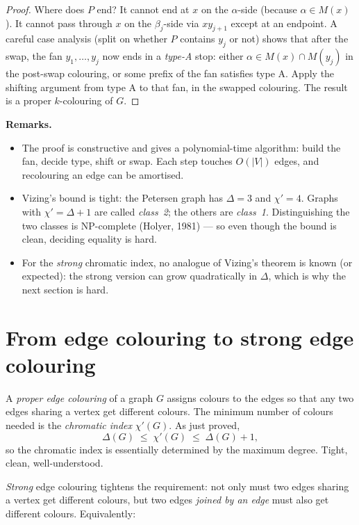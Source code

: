 \documentclass[11pt]{article}
\begin{document}
\begin{proof}
Where does $P$ end? It cannot end at $x$ on the $\alpha$-side
(because $\alpha \in M(x)$). It cannot pass through $x$ on the
$\beta_j$-side via $xy_{j+1}$ except at an endpoint. A careful case
analysis (split on whether $P$ contains $y_j$ or not) shows that
after the swap, the fan $y_1, \dots, y_j$ now ends in a
\emph{type-A} stop: either $\alpha \in M(x) \cap M(y_j)$ in the
post-swap colouring, or some prefix of the fan satisfies type A.
Apply the shifting argument from type A to that fan, in the swapped
colouring. The result is a proper $k$-colouring of $G$.
\end{proof}

\textbf{Remarks.}
\begin{itemize}[leftmargin=*, itemsep=2pt]
  \item The proof is constructive and gives a polynomial-time
        algorithm: build the fan, decide type, shift or swap. Each
        step touches $O(|V|)$ edges, and recolouring an edge can be
        amortised.
  \item Vizing's bound is tight: the Petersen graph has $\Delta = 3$
        and $\chi' = 4$. Graphs with $\chi' = \Delta + 1$ are called
        \emph{class~2}; the others are \emph{class~1}. Distinguishing
        the two classes is NP-complete (Holyer, 1981) --- so even
        though the bound is clean, deciding equality is hard.
  \item For the \emph{strong} chromatic index, no analogue of
        Vizing's theorem is known (or expected): the strong
        version can grow quadratically in $\Delta$, which is why
        the next section is hard.
\end{itemize}

\section*{From edge colouring to strong edge colouring}

A \emph{proper edge colouring} of a graph $G$ assigns colours to the
edges so that any two edges sharing a vertex get different colours.
The minimum number of colours needed is the \emph{chromatic index}
$\chi'(G)$. As just proved,
\[
\Delta(G) \;\leq\; \chi'(G) \;\leq\; \Delta(G) + 1,
\]
so the chromatic index is essentially determined by the maximum degree.
Tight, clean, well-understood.

\emph{Strong} edge colouring tightens the requirement: not only must
two edges sharing a vertex get different colours, but two edges
\emph{joined by an edge} must also get different colours. Equivalently:
\end{document}
